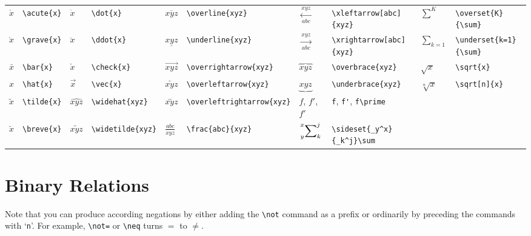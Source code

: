 \documentclass[10pt, english]{article}
\begin{document}
	\begin{center}
		\scriptsize
	\begin{tabular}{ll|ll|ll|ll|ll}
		$\acute{x}$ & \verb|\acute{x}| & $\dot{x}$ & \verb|\dot{x}| & $\overline{xyz}$ & \verb|\overline{xyz}| & $\xleftarrow[abc]{xyz}$ & \verb|\xleftarrow[abc]{xyz}| & $\overset{K}{\sum}$ & \verb|\overset{K}{\sum}| \\
		$\grave{x}$ & \verb|\grave{x}| & $\ddot{x}$ & \verb|\ddot{x}| & $\underline{xyz}$ & \verb|\underline{xyz}| & $\xrightarrow[abc]{xyz}$ & \verb|\xrightarrow[abc]{xyz}| & $\underset{k=1}{\sum}$ & \verb|\underset{k=1}{\sum}| \\
		$\bar{x}$ & \verb|\bar{x}| & $\check{x}$ & \verb|\check{x}| & $\overrightarrow{xyz}$ & \verb|\overrightarrow{xyz}| & $\overbrace{xyz}$ & \verb|\overbrace{xyz}| & $\sqrt{x}$ & \verb|\sqrt{x}| \\
		$\hat{x}$ & \verb|\hat{x}| & $\vec{x}$ & \verb|\vec{x}| & $\overleftarrow{xyz}$ & \verb|\overleftarrow{xyz}| & $\underbrace{xyz}$ & \verb|\underbrace{xyz}| & $\sqrt[n]{x}$ & \verb|\sqrt[n]{x}| \\
		$\tilde{x}$ & \verb|\tilde{x}| & $\widehat{xyz}$ & \verb|\widehat{xyz}| & $\overleftrightarrow{xyz}$ & \verb|\overleftrightarrow{xyz}| & $f$, $f'$, $f\prime$ & \verb|f|, \verb|f'|, \verb|f\prime| \\
		$\breve{x}$ & \verb|\breve{x}| & $\widetilde{xyz}$ & \verb|\widetilde{xyz}| & $\frac{abc}{xyz}$ & \verb|\frac{abc}{xyz}| & $\sideset{_y^x}{_k^j}\sum$ & \verb|\sideset{_y^x}{_k^j}\sum| \\
	\end{tabular}
	\end{center}

\section{Binary Relations}

	Note that you can produce according negations by either adding the \verb|\not| command as a prefix or ordinarily by preceding the commands with `\verb|n|'. For example, \verb|\not=| or \verb|\neq| turns $=$ to $\neq$.
\end{document}
